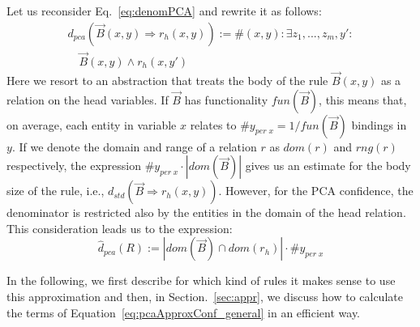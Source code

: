 \noindent Let us reconsider Eq.~\ref{eq:denomPCA} and rewrite it as follows:
\[
\begin{array}{rl}
 d_{pca}(\vec{B}(x,y) \Rightarrow r_h(x,y)) := {} \#(x,y): \exists z_1,...,z_m,y': \\ \quad \vec{B}(x, y) \wedge r_h(x,y')
\end{array}
\]
Here we resort to an abstraction that treats the body of the rule $\vec{B}(x, y)$ as a relation on the head variables. 
If $\vec{B}$ has functionality $fun(\vec{B})$, this means that, on average, each entity in variable $x$ 
relates to $\#y_{per\; x} = 1/fun(\vec{B})$ bindings in $y$. If we denote the domain and range of a relation $r$ as
$dom(r)$ and $rng(r)$ respectively, the expression $\#y_{per\; x} \cdot |dom(\vec{B})|$ gives us 
an estimate for the body size of the rule, i.e., $d_{std}(\vec{B} \Rightarrow r_h(x,y))$. 
However, for the PCA confidence, the denominator is restricted also by the entities in the domain of the head relation.
This consideration leads us to the expression:
\begin{equation} \label{eq:pcaApproxConf_general}
  \widehat{d}_{pca}(R):=|dom(\vec{B}) \cap dom(r_h)|\cdot \#y_{per\; x}
\end{equation}



In the following, we first describe for which kind of rules it makes sense to use this approximation and then, in Section.~\ref{sec:appr}, 
we discuss how to calculate the terms of Equation~\ref{eq:pcaApproxConf_general} in an efficient way. 


